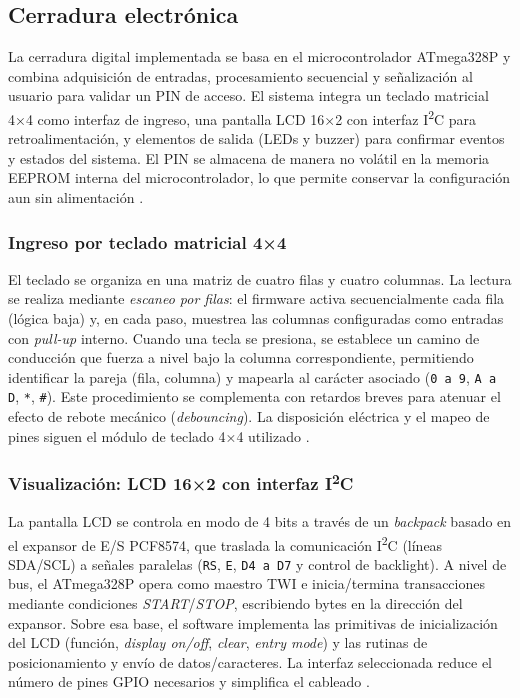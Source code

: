 \subsection{Cerradura electrónica}

La cerradura digital implementada se basa en el microcontrolador ATmega328P y combina adquisición de entradas, procesamiento secuencial y señalización al usuario para validar un PIN de acceso. El sistema integra un teclado matricial 4×4 como interfaz de ingreso, una pantalla LCD 16×2 con interfaz I\textsuperscript{2}C para retroalimentación, y elementos de salida (LEDs y buzzer) para confirmar eventos y estados del sistema. El PIN se almacena de manera no volátil en la memoria EEPROM interna del microcontrolador, lo que permite conservar la configuración aun sin alimentación \cite{atmega328p_datasheet}.

\subsubsection{Ingreso por teclado matricial 4×4}
El teclado se organiza en una matriz de cuatro filas y cuatro columnas. La lectura se realiza mediante \textit{escaneo por filas}: el firmware activa secuencialmente cada fila (lógica baja) y, en cada paso, muestrea las columnas configuradas como entradas con \textit{pull-up} interno. Cuando una tecla se presiona, se establece un camino de conducción que fuerza a nivel bajo la columna correspondiente, permitiendo identificar la pareja (fila, columna) y mapearla al carácter asociado (\texttt{0 a 9}, \texttt{A a D}, \texttt{*}, \texttt{\#}). Este procedimiento se complementa con retardos breves para atenuar el efecto de rebote mecánico (\textit{debouncing}). La disposición eléctrica y el mapeo de pines siguen el módulo de teclado 4×4 utilizado \cite{keypad_4x4_okystar}.

\subsubsection{Visualización: LCD 16×2 con interfaz I\textsuperscript{2}C}
La pantalla LCD se controla en modo de 4 bits a través de un \textit{backpack} basado en el expansor de E/S PCF8574, que traslada la comunicación I\textsuperscript{2}C (líneas SDA/SCL) a señales paralelas (\texttt{RS}, \texttt{E}, \texttt{D4 a D7} y control de backlight). A nivel de bus, el ATmega328P opera como maestro TWI e inicia/termina transacciones mediante condiciones \textit{START}/\textit{STOP}, escribiendo bytes en la dirección del expansor. Sobre esa base, el software implementa las primitivas de inicialización del LCD (función, \textit{display on/off}, \textit{clear}, \textit{entry mode}) y las rutinas de posicionamiento y envío de datos/caracteres. La interfaz seleccionada reduce el número de pines GPIO necesarios y simplifica el cableado \cite{lcd_16x2_i2c_datasheet}.

